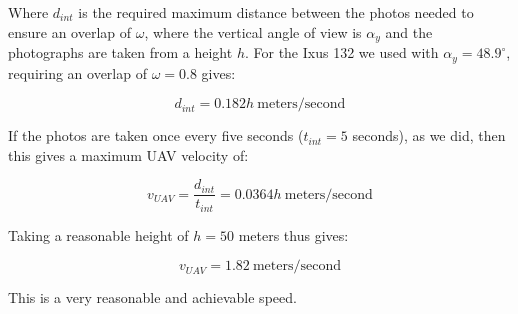 Where $d_{int}$ is the required maximum distance between the photos needed to
ensure an overlap of $\omega$, where the vertical angle of view is $\alpha_y$
and the photographs are taken from a height $h$.  For the Ixus 132 we used with
$\alpha_y = 48.9^{\circ}$, requiring an overlap of $\omega = 0.8$ gives:

\begin{equation}
    d_{int} = 0.182h ~\mathrm{meters/second}
\end{equation}

If the photos are taken once every five seconds ($ t_{int} = 5 $ seconds), as we
did, then this gives a maximum UAV velocity of:

\begin{equation}
    v_{UAV} = \frac{d_{int}}{t_{int}} = 0.0364h ~\mathrm{meters/second}
\end{equation}

Taking a reasonable height of $ h = 50 $ meters thus gives:

\begin{equation}
    v_{UAV} = 1.82 ~\mathrm{meters/second}
\end{equation}

This is a very reasonable and achievable speed.
